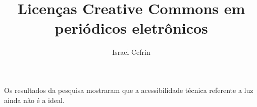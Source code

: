 \documentclass[11pt, oneside]{article}   	%
\title{Licenças Creative Commons em periódicos eletrônicos}
\author{Israel Cefrin}
\date{\displaydate{date}}
\begin{document}
\maketitle

Os resultados da pesquisa mostraram que a acessibilidade técnica referente a luz ainda não é a ideal.
\end{document}
